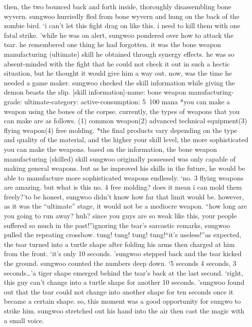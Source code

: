 then, the two bounced back and forth inside, thoroughly disassembling bone wyvern.
 sungwoo hurriedly fled from bone wyvern and hung on the back of the zombie bird.
‘i can’t let this fight drag on like this.
 i need to kill them with one fatal strike.
’while he was on alert, sungwoo pondered over how to attack the tsar.
 he remembered one thing he had forgotten.
 it was the bone weapon manufacturing (ultimate) skill he obtained through synergy effects.
 he was so absent-minded with the fight that he could not check it out in such a hectic situation, but he thought it would give him a way out.
 now, was the time he needed a game maker.
sungwoo checked the skill information while giving the demon beasts the slip.
[skill information]-name: bone weapon manufacturing-grade: ultimate-category: active-consumption: 5~100 mana
*you can make a weapon using the bones of the corpse.
 currently, the types of weapons that you can make are as follows.
(1) common weapon(2) advanced technical equipment(3) flying weapon(4) free molding.
*the final products vary depending on the type and quality of the material, and the higher your skill level, the more sophisticated you can make the weapons.
based on the information, the bone weapon manufacturing (skilled) skill sungwoo originally possessed was only capable of making general weapons.
 but as he improved his skills in the future, he would be able to manufacture more sophisticated weapons endlessly.
‘no.
 3 flying weapons are amazing.
 but what is this no.
 4 free molding? does it mean i can mold them freely?’to be honest, sungwoo didn’t know how far that limit would be.
 however, as it was the “ultimate” stage, it would not be a mediocre weapon.
“how long are you going to run away? huh? since you guys are so weak like this, your people suffered so much in the past!”ignoring the tsar’s sarcastic remarks, sungwoo pulled the repeating crossbow.
tung! tung! tung! tung!“it’s useless!”as expected, the tsar turned into a turtle shape after folding his arms then charged at him from the front.
‘it’s only 10 seconds.
’sungwoo stepped back and the tsar kicked the ground.
sungwoo counted the numbers deep down.
‘5 seconds 4 seconds, 3 seconds…’a tiger shape emerged behind the tsar’s back at the last second.
‘right, this guy can’t change into a turtle shape for another 10 seconds.
’sungwoo found out that the tsar could not change into another shape for ten seconds once it became a certain shape.
 so, this moment was a good opportunity for sungwo to strike him.
sungwoo stretched out his hand into the air then cast the magic with a small voice.
